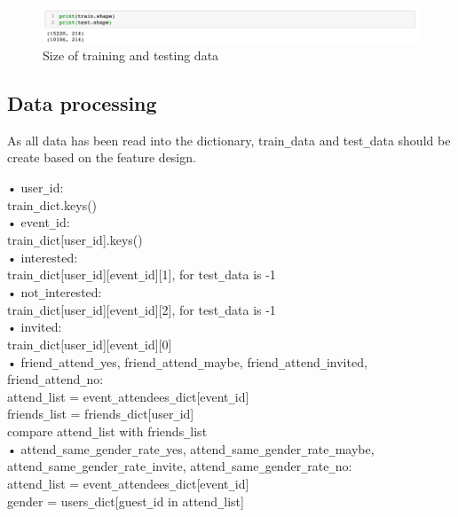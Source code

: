 \documentclass{article}
\begin{document}
\begin{figure}[h]
  \centering
  \includegraphics[width=1.0\textwidth]{img/Picture 0}
  \caption{Size of training and testing data}
\end{figure}

\subsection{Data processing}

As all data has been read into the dictionary, train\verb+_+data and test\verb+_+data should be create based on the feature design.

•	user\verb+_+id: \\
	train\verb+_+dict.keys()\\
•	event\verb+_+id: \\
	train\verb+_+dict[user\verb+_+id].keys()\\
•	interested: \\
	train\verb+_+dict[user\verb+_+id][event\verb+_+id][1], for test\verb+_+data is -1\\
•	not\verb+_+interested: \\
	train\verb+_+dict[user\verb+_+id][event\verb+_+id][2], for test\verb+_+data is -1\\
•	invited: \\
	train\verb+_+dict[user\verb+_+id][event\verb+_+id][0]\\
•	friend\verb+_+attend\verb+_+yes, friend\verb+_+attend\verb+_+maybe, friend\verb+_+attend\verb+_+invited, friend\verb+_+attend\verb+_+no: \\
	attend\verb+_+list = event\verb+_+attendees\verb+_+dict[event\verb+_+id]\\
	friends\verb+_+list = friends\verb+_+dict[user\verb+_+id]\\
	compare attend\verb+_+list with friends\verb+_+list\\
•	attend\verb+_+same\verb+_+gender\verb+_+rate\verb+_+yes, attend\verb+_+same\verb+_+gender\verb+_+rate\verb+_+maybe, attend\verb+_+same\verb+_+gender\verb+_+rate\verb+_+invite, attend\verb+_+same\verb+_+gender\verb+_+rate\verb+_+no: \\
	attend\verb+_+list = event\verb+_+attendees\verb+_+dict[event\verb+_+id]\\
	gender = users\verb+_+dict[guest\verb+_+id in attend\verb+_+list]\\
\end{document}
